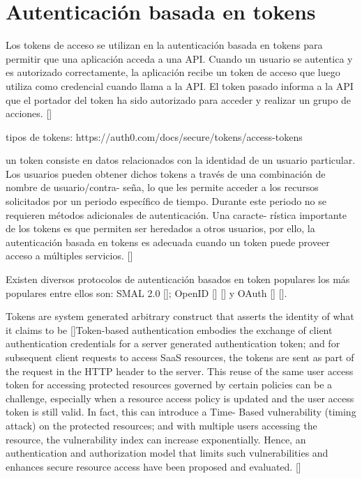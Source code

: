 
\section{Autenticación basada en tokens}

Los tokens de acceso se utilizan en la autenticación basada en tokens para permitir que una aplicación acceda a una API. Cuando un usuario se autentica y es autorizado correctamente, la aplicación recibe un token de acceso que luego utiliza como credencial cuando llama a la API. El token pasado informa a la API que el portador del token ha sido autorizado para acceder y realizar un grupo de acciones. [\cite{auth0AccessTokens}]

tipos de tokens: https://auth0.com/docs/secure/tokens/access-tokens

un token consiste en datos relacionados con la identidad de un usuario particular. Los usuarios pueden obtener dichos tokens a través de una combinación de nombre de usuario/contra- seña, lo que les permite acceder a los recursos solicitados por un periodo específico de tiempo. Durante este periodo no se requieren métodos adicionales de autenticación. Una caracte- rística importante de los tokens es que permiten ser heredados a otros usuarios, por ello, la autenticación basada en tokens es adecuada cuando un token puede proveer acceso a múltiples servicios. [\cite{banerjee2018token}] %

Existen diversos protocolos de autenticación basados en token populares los más populares entre ellos son: SMAL 2.0 [\cite{cantor2005assertions}]; OpenID [\cite{recordon2006openid}] [\cite{mainka2017sok}] y OAuth [\cite{hardt2012oauth}] [\cite{richer2017oauth}]. 

Tokens are system generated arbitrary construct that asserts the identity of what it claims to be [\cite{zheng2014token}]Token-based authentication embodies the exchange of client authentication credentials for a server generated authentication token; and for subsequent client requests to access SaaS resources, the tokens are sent as part of the request in the HTTP header to the server. This reuse of the same user access token for accessing protected resources governed by certain policies can be a challenge, especially when a resource access policy is updated and the user access token is still valid. In fact, this can introduce a Time- Based vulnerability (timing attack) on the protected resources; and with multiple users accessing the resource, the vulnerability index can increase exponentially. Hence, an authentication and authorization model that limits such vulnerabilities and enhances secure resource access have been proposed and evaluated. [\cite{ethelbert2017json}]

